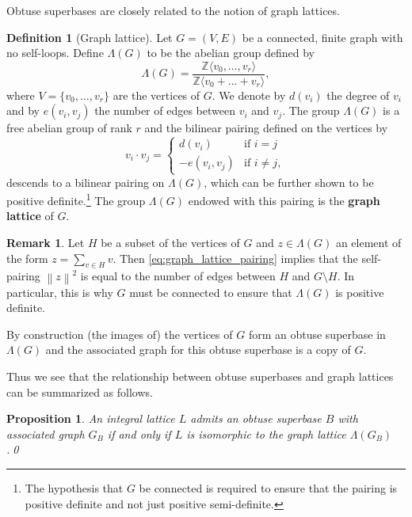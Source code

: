 \documentclass{amsart} %
\newcommand{\Z}{\mathbb{Z}}
\newcommand{\norm}[1]{\left\lVert #1 \right\rVert^2}
\theoremstyle{thm}
\newtheorem{prop}[Theorem]{Proposition}
\theoremstyle{definition}
\newtheorem{defi}[Theorem]{Definition}
\newtheorem{rem}[Theorem]{Remark}
\numberwithin{equation}{section}
\begin{document}
Obtuse superbases are closely related to the notion of graph lattices.
\begin{defi}[Graph lattice]
    Let $G=(V,E)$ be a connected, finite graph with no self-loops. Define $\Lambda(G)$ to be the abelian group defined by
    \[
    \Lambda(G)= \frac{\Z\langle v_0, \dots , v_r \rangle}{\Z \langle v_0 + \dots + v_r \rangle},
    \]
    where $V=\{v_0, \dots, v_r\}$ are the vertices of $G$.
    We denote by $d(v_i)$ the degree of $v_i$ and by $e(v_i,v_j)$ the number of edges between $v_i$ and $v_j$.
    The group $\Lambda(G)$ is a free abelian group of rank $r$ and the bilinear pairing defined on the vertices by 
    \begin{equation}\label{eq:graph_lattice_pairing}
v_i\cdot v_j = \begin{cases}
    d(v_i) &\text{if $i=j$}\\
    -e(v_i,v_j) &\text{if $i\neq j$},
\end{cases}
\end{equation}
descends to a bilinear pairing on $\Lambda(G)$, which can be further shown to be positive definite.\footnote{The hypothesis that $G$ be connected is required to ensure that the pairing is positive definite and not just positive semi-definite.} The group $\Lambda(G)$ endowed with this pairing is the \textbf{graph lattice} of $G$.  
\end{defi}
\begin{rem}\label{rem:edge_count}
    Let $H$ be a subset of the vertices of $G$ and $z\in \Lambda(G)$ an element of the form $z=\sum_{v\in H} v$. Then \eqref{eq:graph_lattice_pairing} implies that the self-pairing $\norm{z}$ is equal to the number of edges between $H$ and $G\setminus H$. In particular, this is why $G$ must be connected to ensure that $\Lambda(G)$ is positive definite.
\end{rem}

By construction (the images of) the vertices of $G$ form an obtuse superbase in $\Lambda(G)$ and the associated graph for this obtuse superbase is a copy of $G$.

Thus we see that the relationship between obtuse superbases and graph lattices can be summarized as follows.
\begin{prop}\label{prop:ObtSupBase=graphlattice}
    An integral lattice $L$ admits an obtuse superbase $B$ with associated graph $G_B$ if and only if $L$ is isomorphic to the graph lattice $\Lambda(G_B)$.\qed
\end{prop}
\end{document}
